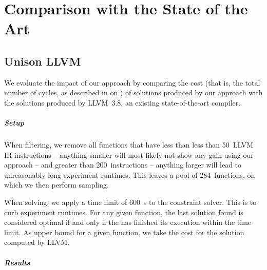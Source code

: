 %

\chapter{Comparison with the State of the Art}



\section{Unison \versus LLVM}

We evaluate the impact of our approach by comparing the cost (that is, the total
number of cycles, as described in  on
) of \glspl{solution} produced by our
approach with the \glspl{solution} produced by \mbox{\gls{LLVM} 3.8}, an
existing state-of-the-art \gls{compiler}.


\paragraph{Setup}

When filtering, we remove all \glspl{function} that have less than less than
\num{50}~\gls{LLVM} \gls{IR} \glspl{instruction} -- anything smaller will most
likely not show any gain using our approach -- and greater than
\num{200}~\glspl{instruction} -- anything larger will lead to unreasonably long
experiment runtimes.
%
This leaves a pool of \num{284}~\glspl{function}, on which we then perform
sampling.

When solving, we apply a time limit of \SI{600}{\s} to the \gls{constraint
  solver}.
%
This is to curb experiment runtimes.
%
For any given \gls{function}, the last \gls{solution} found is considered
optimal if and only if the  has finished its
execution within the time limit.
%
As upper bound for a given \gls{function}, we take the cost for the
\gls{solution} computed by \gls{LLVM}.


\paragraph{Results}

